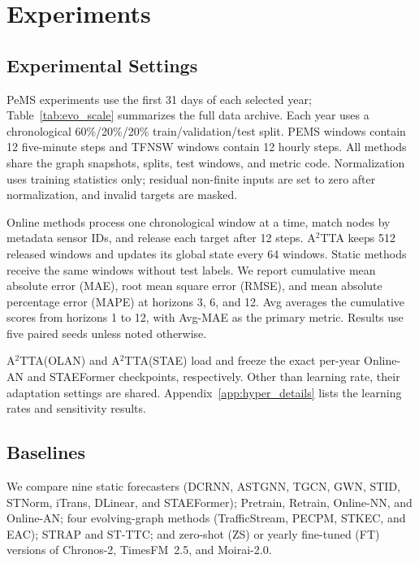 \section{Experiments}
\label{exp}




\subsection{Experimental Settings}

PeMS experiments use the first 31 days of each selected year;
Table~\ref{tab:evo_scale} summarizes the full data archive.
Each year uses a chronological 60\%/20\%/20\% train/validation/test split.
PEMS windows contain 12 five-minute steps and TFNSW windows contain 12 hourly
steps. All methods share the graph snapshots, splits, test windows, and metric
code. Normalization uses training statistics only; residual non-finite inputs
are set to zero after normalization, and invalid targets are masked.

Online methods process one chronological window at a time, match nodes by
metadata sensor IDs, and release each target after 12 steps. A$^2$TTA keeps
512 released windows and updates its global state every 64 windows. Static
methods receive the same windows without test labels. We report cumulative
mean absolute error (MAE), root mean square error (RMSE), and mean absolute
percentage error (MAPE) at horizons 3, 6, and 12. Avg averages the cumulative
scores from horizons 1 to 12, with Avg-MAE as the primary metric. Results use
five paired seeds unless noted otherwise.

A$^2$TTA(OLAN) and A$^2$TTA(STAE) load and freeze the exact per-year
Online-AN and STAEFormer checkpoints, respectively. Other than learning rate,
their adaptation settings are shared. Appendix~\ref{app:hyper_details} lists
the learning rates and sensitivity results.



\subsection{Baselines}

We compare nine static forecasters (DCRNN, ASTGNN, TGCN, GWN, STID, STNorm,
iTrans, DLinear, and STAEFormer); Pretrain, Retrain, Online-NN, and Online-AN;
four evolving-graph methods (TrafficStream, PECPM, STKEC, and EAC); STRAP and
ST-TTC; and zero-shot (ZS) or yearly fine-tuned (FT) versions of Chronos-2,
TimesFM~2.5, and Moirai-2.0.

